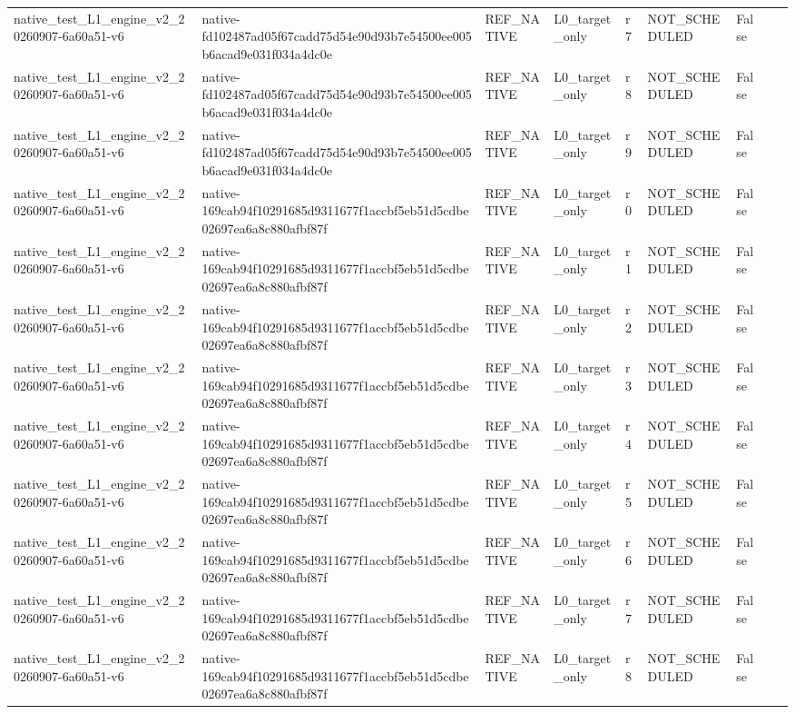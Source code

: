 \begin{tabular}{lllllllll}
native\_test\_L1\_engine\_v2\_20260907-6a60a51-v6 & native-fd102487ad05f67cadd75d54e90d93b7e54500ee005b6acad9e031f034a4dc0e & REF\_NATIVE & L0\_target\_only & r7 & NOT\_SCHEDULED & False &  &  \\
native\_test\_L1\_engine\_v2\_20260907-6a60a51-v6 & native-fd102487ad05f67cadd75d54e90d93b7e54500ee005b6acad9e031f034a4dc0e & REF\_NATIVE & L0\_target\_only & r8 & NOT\_SCHEDULED & False &  &  \\
native\_test\_L1\_engine\_v2\_20260907-6a60a51-v6 & native-fd102487ad05f67cadd75d54e90d93b7e54500ee005b6acad9e031f034a4dc0e & REF\_NATIVE & L0\_target\_only & r9 & NOT\_SCHEDULED & False &  &  \\
native\_test\_L1\_engine\_v2\_20260907-6a60a51-v6 & native-169cab94f10291685d9311677f1accbf5eb51d5cdbe02697ea6a8c880afbf87f & REF\_NATIVE & L0\_target\_only & r0 & NOT\_SCHEDULED & False &  &  \\
native\_test\_L1\_engine\_v2\_20260907-6a60a51-v6 & native-169cab94f10291685d9311677f1accbf5eb51d5cdbe02697ea6a8c880afbf87f & REF\_NATIVE & L0\_target\_only & r1 & NOT\_SCHEDULED & False &  &  \\
native\_test\_L1\_engine\_v2\_20260907-6a60a51-v6 & native-169cab94f10291685d9311677f1accbf5eb51d5cdbe02697ea6a8c880afbf87f & REF\_NATIVE & L0\_target\_only & r2 & NOT\_SCHEDULED & False &  &  \\
native\_test\_L1\_engine\_v2\_20260907-6a60a51-v6 & native-169cab94f10291685d9311677f1accbf5eb51d5cdbe02697ea6a8c880afbf87f & REF\_NATIVE & L0\_target\_only & r3 & NOT\_SCHEDULED & False &  &  \\
native\_test\_L1\_engine\_v2\_20260907-6a60a51-v6 & native-169cab94f10291685d9311677f1accbf5eb51d5cdbe02697ea6a8c880afbf87f & REF\_NATIVE & L0\_target\_only & r4 & NOT\_SCHEDULED & False &  &  \\
native\_test\_L1\_engine\_v2\_20260907-6a60a51-v6 & native-169cab94f10291685d9311677f1accbf5eb51d5cdbe02697ea6a8c880afbf87f & REF\_NATIVE & L0\_target\_only & r5 & NOT\_SCHEDULED & False &  &  \\
native\_test\_L1\_engine\_v2\_20260907-6a60a51-v6 & native-169cab94f10291685d9311677f1accbf5eb51d5cdbe02697ea6a8c880afbf87f & REF\_NATIVE & L0\_target\_only & r6 & NOT\_SCHEDULED & False &  &  \\
native\_test\_L1\_engine\_v2\_20260907-6a60a51-v6 & native-169cab94f10291685d9311677f1accbf5eb51d5cdbe02697ea6a8c880afbf87f & REF\_NATIVE & L0\_target\_only & r7 & NOT\_SCHEDULED & False &  &  \\
native\_test\_L1\_engine\_v2\_20260907-6a60a51-v6 & native-169cab94f10291685d9311677f1accbf5eb51d5cdbe02697ea6a8c880afbf87f & REF\_NATIVE & L0\_target\_only & r8 & NOT\_SCHEDULED & False &  &  \\

\end{tabular}
